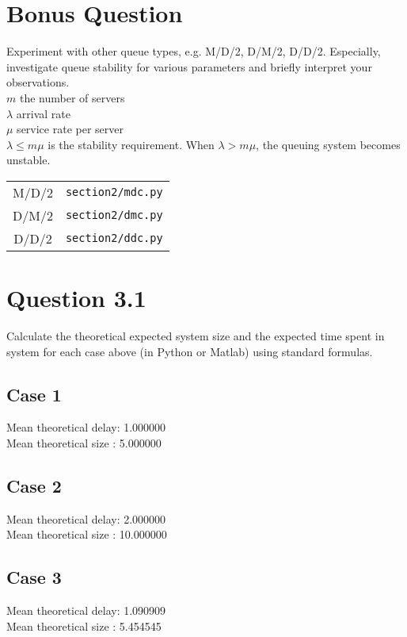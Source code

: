 \documentclass{article}
\newenvironment{homeworkProblem}[1]{
	\section*{#1}
	}{
}
\newenvironment{homeworkSection}[1]{
	\subsection*{#1}
	}{
}
\begin{document}

\begin{homeworkProblem}{Bonus Question}
Experiment with other queue types, e.g. M/D/2, D/M/2, D/D/2. Especially, investigate queue stability for various parameters and briefly interpret your observations.\\

$m$ the number of servers\\
$\lambda$ arrival rate\\
$\mu$ service rate per server\\

$\lambda \le m \mu$ is the stability requirement. When $\lambda > m \mu$, the queuing system becomes unstable.\\

\begin{tabular}{c c}
M/D/2 &\texttt{section2/mdc.py}\\
D/M/2 &\texttt{section2/dmc.py}\\
D/D/2 &\texttt{section2/ddc.py}
\end{tabular}
\end{homeworkProblem}


\begin{homeworkProblem}{Question 3.1}
Calculate the theoretical expected system size and the expected time spent in system for each case above (in Python or Matlab) using standard formulas.

\begin{homeworkSection}{Case 1}
Mean theoretical delay: 1.000000\\
Mean theoretical size : 5.000000
\end{homeworkSection}

\begin{homeworkSection}{Case 2}
Mean theoretical delay: 2.000000\\
Mean theoretical size : 10.000000
\end{homeworkSection}

\begin{homeworkSection}{Case 3}
Mean theoretical delay: 1.090909\\
Mean theoretical size : 5.454545
\end{homeworkSection}
\end{homeworkProblem}
\end{document}
